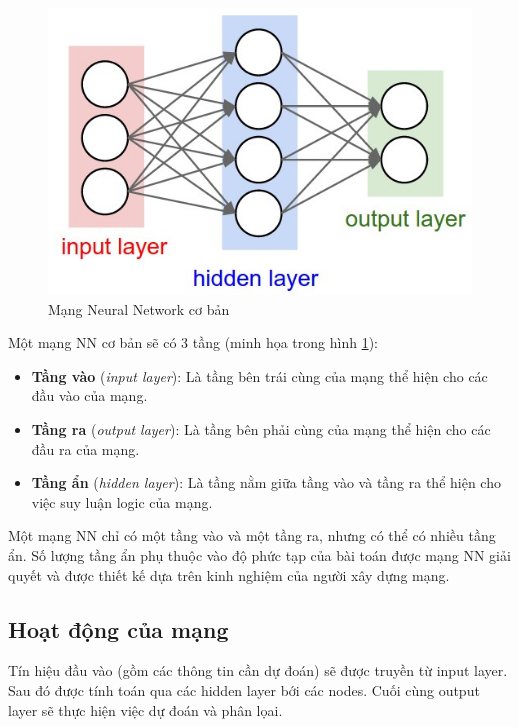 \FloatBarrier
\begin{figure}[htp]
\begin{center}
\includegraphics[scale=0.8]{chap2/c2_figs/structure_NN.PNG}
\end{center}
\caption{Mạng Neural Network cơ bản}
\label{fig:structure_NN}
\end{figure}
\FloatBarrier

Một mạng NN cơ bản sẽ có 3 tầng (minh họa trong hình \ref{fig:structure_NN}):
\begin{itemize}
\item \textbf{Tầng vào} (\textit{input layer}): Là tầng bên trái cùng của mạng thể hiện cho các đầu vào của mạng.
\item \textbf{Tầng ra} (\textit{output layer}): Là tầng bên phải cùng của mạng thể hiện cho các đầu ra của mạng.
\item \textbf{Tầng ẩn} (\textit{hidden layer}): Là tầng nằm giữa tầng vào và tầng ra thể hiện cho việc suy luận logic của mạng.
\end{itemize}

Một mạng NN chỉ có một tầng vào và một tầng ra, nhưng có thể có nhiều tầng ẩn. Số lượng tầng ẩn phụ thuộc vào độ phức tạp của bài toán được mạng NN giải quyết và được thiết kế dựa trên kinh nghiệm của người xây dựng mạng.

\subsection{Hoạt động của mạng}
\label{hoat_dong_cua_mang}

Tín hiệu đầu vào (gồm các thông tin cần dự đoán) sẽ được truyền từ input layer. Sau đó được tính toán qua các hidden layer bới các nodes. Cuối cùng output layer sẽ thực hiện việc dự đoán và phân lọai.\\


